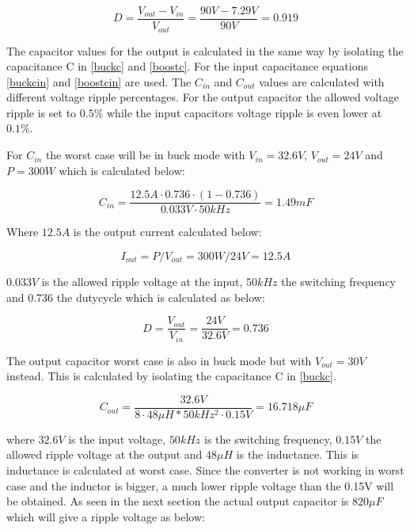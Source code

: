 \begin{equation}
D = \frac{V_{out}-V_{in}}{V_{out}} = \frac{90V-7.29V}{90V} = 0.919
\end{equation} 

The capacitor values for the output is calculated in the same way by isolating the capacitance C in \ref{buckc} and \ref{boostc}. For the input capacitance equations \ref{buckcin} and \ref{boostcin} are used.
The $C_{in}$ and $C_{out}$ values are calculated with different voltage ripple percentages. For the output capacitor the allowed voltage ripple is set to $0.5\%$ while the input capacitors voltage ripple is even lower at $0.1\%$. 

For $C_{in}$ the worst case will be in buck mode with $V_{in}=32.6V$, $V_{out}=24V$ and $P=300W$ which is calculated below:

\begin{equation}
C_{in} = \frac{12.5A\cdot 0.736\cdot (1-0.736)}{0.033V\cdot 50kHz} = 1.49mF
\end{equation}    

Where $12.5A$ is the output current calculated below:

\begin{equation}
I_{out} = P/V_{out} = 300W/24V = 12.5A
\end{equation}

$0.033V$ is the allowed ripple voltage at the input, $50kHz$ the switching frequency and 0.736 the dutycycle which is calculated as below:

\begin{equation}
D = \frac{V_{out}}{V_{in}} = \frac{24V}{32.6V} = 0.736
\end{equation} 


The output capacitor worst case is also in buck mode but with $V_{out}=30V$  instead. This is calculated by isolating the capacitance C in \ref{buckc}. 

\begin{equation} \label{buckc} 
C_{out} = \frac{32.6V}{8\cdot 48\mu H*50kHz^2\cdot 0.15V} = 16.718\mu F
\end{equation}

where $32.6V$ is the input voltage, $50kHz$ is the switching frequency, $0.15V$ the allowed ripple voltage at the output and $48\mu H$ is the inductance. This is inductance is calculated at worst case. 
Since the converter is not working in worst case and the inductor is bigger, a much lower ripple voltage than the 0.15V will be obtained. As seen in the next section the actual output capacitor is $820\mu F$ which will give a ripple voltage as below:

